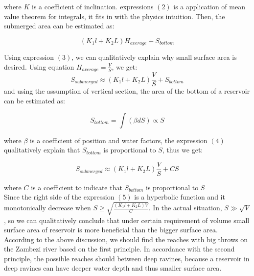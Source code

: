 \documentclass{mcmthesis}
\begin{document}
where $K$ is a coefficient of inclination. expressions $\left(2\right)$ is a application of mean value theorem for integrals, it fits in with the physics intuition. Then, the submerged area can be estimated as:

\begin{equation}
\left(K_{1}l + K_{2}L\right)H_{average} + S_{bottom}
\end{equation}

Using expression $\left(3\right)$, we can qualitatively explain why small surface area is desired. Using equation $H_{average} = \frac{V}{S}$, we get:
\[S_{submerged} \approx \left(K_{1}l + K_{2}L\right)\frac{V}{S} + S_{bottom}\]
and using the assumption of vertical section, the area of the bottom of a reservoir can be estimated as:

\begin{equation}
S_{bottom} = \int\left(\beta dS \right) \propto S
\end{equation}  

where $\beta$ is a coefficient of position and water factors, the expression $\left(4\right)$ qualitatively explain that $S_{bottom}$ is proportional to $S$, thus we get:

\begin{equation}
S_{submerged} \approx \left(K_{1}l + K_{2}L\right)\frac{V}{S} + CS
\end{equation}

where $C$ is a coefficient to indicate that $S_{bottom}$ is proportional to $S$\\
Since the right side of the expression $\left(5\right)$ is a hyperbolic function and it monotonically decrease when $S \geq \sqrt{\frac{\left(K_{1}l + K_{2}L\right)V}{C}}$. In the actual situation, $S \gg \sqrt{V}$, so we can qualitatively conclude that under certain requirement of volume small surface area of reservoir is more beneficial than the bigger surface area.\\
\indent According to the above discussion, we should find the reaches with big throws on the Zambezi river based on the first principle. In accordance with the second principle, the possible reaches should between deep ravines, because a reservoir in deep ravines can have deeper water depth and thus smaller surface area.
\end{document}
